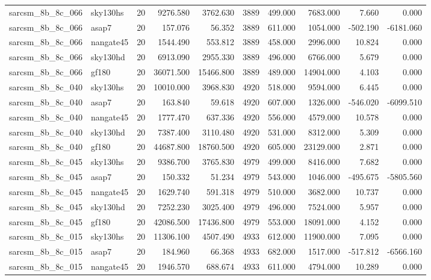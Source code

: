 \begin{tabular}{llrrrrrrrr}
sarcsm\_8b\_8c\_066 & sky130hs & 20 & 9276.580 & 3762.630 & 3889 & 499.000 & 7683.000 & 7.660 & 0.000 \\
sarcsm\_8b\_8c\_066 & asap7 & 20 & 157.076 & 56.352 & 3889 & 611.000 & 1054.000 & -502.190 & -6181.060 \\
sarcsm\_8b\_8c\_066 & nangate45 & 20 & 1544.490 & 553.812 & 3889 & 458.000 & 2996.000 & 10.824 & 0.000 \\
sarcsm\_8b\_8c\_066 & sky130hd & 20 & 6913.090 & 2955.330 & 3889 & 496.000 & 6766.000 & 5.679 & 0.000 \\
sarcsm\_8b\_8c\_066 & gf180 & 20 & 36071.500 & 15466.800 & 3889 & 489.000 & 14904.000 & 4.103 & 0.000 \\
sarcsm\_8b\_8c\_040 & sky130hs & 20 & 10010.000 & 3968.830 & 4920 & 518.000 & 9594.000 & 6.445 & 0.000 \\
sarcsm\_8b\_8c\_040 & asap7 & 20 & 163.840 & 59.618 & 4920 & 607.000 & 1326.000 & -546.020 & -6099.510 \\
sarcsm\_8b\_8c\_040 & nangate45 & 20 & 1777.470 & 637.336 & 4920 & 556.000 & 4579.000 & 10.578 & 0.000 \\
sarcsm\_8b\_8c\_040 & sky130hd & 20 & 7387.400 & 3110.480 & 4920 & 531.000 & 8312.000 & 5.309 & 0.000 \\
sarcsm\_8b\_8c\_040 & gf180 & 20 & 44687.800 & 18760.500 & 4920 & 605.000 & 23129.000 & 2.871 & 0.000 \\
sarcsm\_8b\_8c\_045 & sky130hs & 20 & 9386.700 & 3765.830 & 4979 & 499.000 & 8416.000 & 7.682 & 0.000 \\
sarcsm\_8b\_8c\_045 & asap7 & 20 & 150.332 & 51.234 & 4979 & 543.000 & 1046.000 & -495.675 & -5805.560 \\
sarcsm\_8b\_8c\_045 & nangate45 & 20 & 1629.740 & 591.318 & 4979 & 510.000 & 3682.000 & 10.737 & 0.000 \\
sarcsm\_8b\_8c\_045 & sky130hd & 20 & 7252.230 & 3025.400 & 4979 & 496.000 & 7524.000 & 5.957 & 0.000 \\
sarcsm\_8b\_8c\_045 & gf180 & 20 & 42086.500 & 17436.800 & 4979 & 553.000 & 18091.000 & 4.152 & 0.000 \\
sarcsm\_8b\_8c\_015 & sky130hs & 20 & 11306.100 & 4507.490 & 4933 & 612.000 & 11900.000 & 7.095 & 0.000 \\
sarcsm\_8b\_8c\_015 & asap7 & 20 & 184.960 & 66.368 & 4933 & 682.000 & 1517.000 & -517.812 & -6566.160 \\
sarcsm\_8b\_8c\_015 & nangate45 & 20 & 1946.570 & 688.674 & 4933 & 611.000 & 4794.000 & 10.289 & 0.000 \\

\end{tabular}
